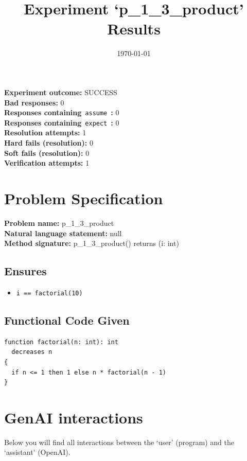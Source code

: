 \documentclass{article}
\begin{document}
\title{Experiment `p\_1\_3\_product' Results}
\author{\today}
\date{}
\maketitle
\textbf{Experiment outcome: }SUCCESS
\\\textbf{Bad responses: }0
\\\textbf{Responses containing}~\texttt{assume}~\textbf{: }0
\\\textbf{Responses containing}~\texttt{expect}~\textbf{: }0
\\\textbf{Resolution attempts: }1
\\\textbf{Hard fails (resolution): }0
\\\textbf{Soft fails (resolution): }0
\\\textbf{Verification attempts: }1
\section*{Problem Specification}
\textbf{Problem name: }p\_1\_3\_product
\\\textbf{Natural language statement: }null
\\\textbf{Method signature: }p\_1\_3\_product() returns (i: int)
\subsection*{Ensures}
\begin{itemize}
\item \texttt{i == factorial(10)}
\end{itemize}
\subsection*{Functional Code Given}
\begin{lstlisting}
function factorial(n: int): int
  decreases n
{
  if n <= 1 then 1 else n * factorial(n - 1)
}
\end{lstlisting}
\clearpage
\section*{GenAI interactions}
Below you will find all interactions between the `user' (program) and the `assistant' (OpenAI).
\end{document}
